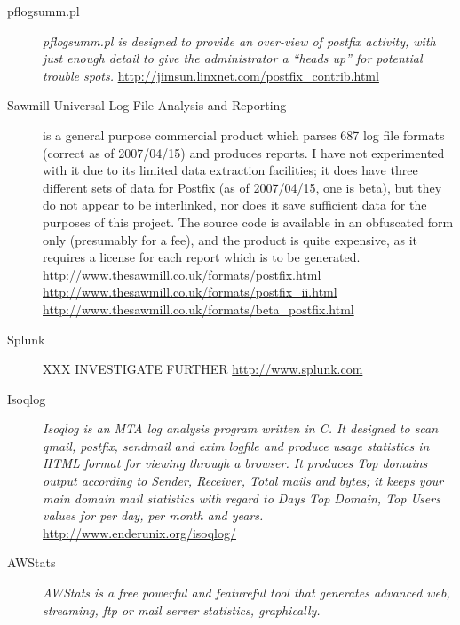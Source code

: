 \documentclass[a4paper,12pt,draft]{article}
\begin{document}
\begin{description}

    \item [pflogsumm.pl] \textit{pflogsumm.pl is designed to provide an
        over-view of postfix activity, with just enough detail to give the
        administrator a ``heads up'' for potential trouble spots.\/}
        \newline \url{http://jimsun.linxnet.com/postfix_contrib.html}

    \item [Sawmill Universal Log File Analysis and Reporting] is a
        general purpose commercial product which parses 687 log file
        formats (correct as of 2007/04/15) and produces reports.  I have not
        experimented with it due to its limited data extraction facilities;
        it does have three different sets of data for Postfix (as of
        2007/04/15, one is beta), but they do not appear to be interlinked,
        nor does it save sufficient data for the purposes of this project.
        The source code is available in an obfuscated form only (presumably
        for a fee), and the product is quite expensive, as it requires a
        license for each report which is to be generated. \newline
        \url{http://www.thesawmill.co.uk/formats/postfix.html} \newline
        \url{http://www.thesawmill.co.uk/formats/postfix_ii.html} \newline
        \url{http://www.thesawmill.co.uk/formats/beta_postfix.html}

    \item [Splunk] XXX INVESTIGATE FURTHER \url{http://www.splunk.com}

    \item [Isoqlog] \textit{Isoqlog is an MTA log analysis program written
        in C. It designed to scan qmail, postfix, sendmail and exim logfile
        and produce usage statistics in HTML format for viewing through a
        browser. It produces Top domains output according to Sender,
        Receiver, Total mails and bytes; it keeps your main domain mail
        statistics with regard to Days Top Domain, Top Users values for per
        day, per month and years.\/}  \newline
        \url{http://www.enderunix.org/isoqlog/}

    \item [AWStats] \textit{AWStats is a free powerful and featureful tool
        that generates advanced web, streaming, ftp or mail server
        statistics, graphically.\/}
        

\end{description}
\end{document}
